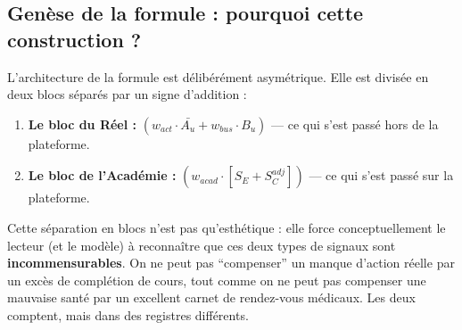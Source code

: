 \documentclass[11pt,a4paper]{article}
\begin{document}
\subsection{Genèse de la formule : pourquoi cette construction ?}

L'architecture de la formule est délibérément asymétrique. Elle est divisée en deux blocs séparés par un signe d'addition :
\begin{enumerate}
    \item \textbf{Le bloc du Réel :} $(w_{act} \cdot \bar{A_u} + w_{bus} \cdot B_u)$ — ce qui s'est passé hors de la plateforme.
    \item \textbf{Le bloc de l'Académie :} $(w_{acad} \cdot [S_E + S_C^{adj}])$ — ce qui s'est passé sur la plateforme.
\end{enumerate}

Cette séparation en blocs n'est pas qu'esthétique : elle force conceptuellement le lecteur (et le modèle) à reconnaître que ces deux types de signaux sont \textbf{incommensurables}. On ne peut pas ``compenser'' un manque d'action réelle par un excès de complétion de cours, tout comme on ne peut pas compenser une mauvaise santé par un excellent carnet de rendez-vous médicaux. Les deux comptent, mais dans des registres différents.
\end{document}

